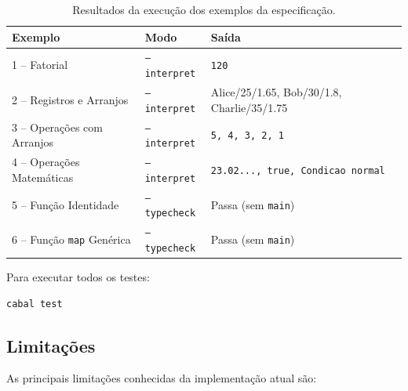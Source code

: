 \documentclass[12pt,a4paper]{article}
\begin{document}
\begin{table}[h!]
\centering
\begin{tabular}{|l|l|l|}
\hline
\textbf{Exemplo} & \textbf{Modo} & \textbf{Saída} \\
\hline
1 -- Fatorial & \texttt{--interpret} & \texttt{120} \\
2 -- Registros e Arranjos & \texttt{--interpret} & Alice/25/1.65, Bob/30/1.8, Charlie/35/1.75 \\
3 -- Operações com Arranjos & \texttt{--interpret} & \texttt{5, 4, 3, 2, 1} \\
4 -- Operações Matemáticas & \texttt{--interpret} & \texttt{23.02..., true, Condicao normal} \\
5 -- Função Identidade & \texttt{--typecheck} & Passa (sem \texttt{main}) \\
6 -- Função \texttt{map} Genérica & \texttt{--typecheck} & Passa (sem \texttt{main}) \\
\hline
\end{tabular}
\caption{Resultados da execução dos exemplos da especificação.}
\end{table}

Para executar todos os testes:

\begin{lstlisting}[language=bash,style=mystyle]
cabal test
\end{lstlisting}

\subsection{Limitações}

As principais limitações conhecidas da implementação atual são:
\end{document}
